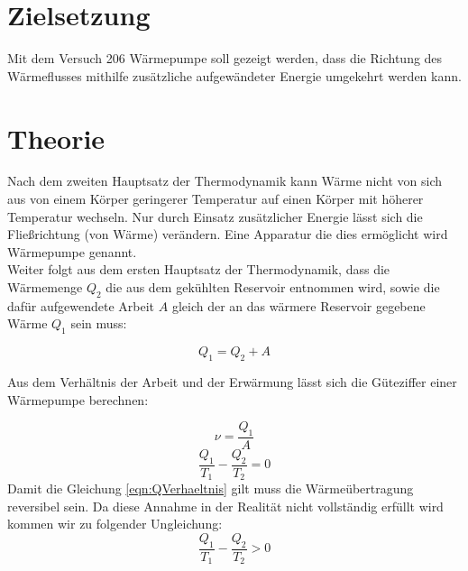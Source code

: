 \section{Zielsetzung}
\label{sec:Zielsetzung}

Mit dem Versuch 206 Wärmepumpe soll gezeigt werden, dass die Richtung des Wärmeflusses mithilfe zusätzliche aufgewändeter
Energie umgekehrt werden kann.


\section{Theorie}
\label{sec:Theorie}
Nach dem zweiten Hauptsatz der Thermodynamik kann Wärme nicht von sich aus von einem Körper geringerer Temperatur auf einen Körper 
mit höherer Temperatur wechseln. Nur durch Einsatz zusätzlicher Energie lässt sich die Fließrichtung (von Wärme) verändern.
Eine Apparatur die dies ermöglicht wird Wärmepumpe genannt.\\
Weiter folgt aus dem ersten Hauptsatz der Thermodynamik, dass die Wärmemenge $Q_2$ die aus dem gekühlten Reservoir entnommen wird,
sowie die dafür aufgewendete Arbeit $A$ gleich der an das wärmere Reservoir gegebene Wärme $Q_1$ sein muss:

\begin{equation}\label{eqn:hauptsatz1}
    Q_1 = Q_2 + A
\end{equation}

Aus dem Verhältnis der Arbeit und der Erwärmung lässt sich die Güteziffer einer Wärmepumpe berechnen:

\begin{equation}\label{eqn:gueteziffer}
    ν = \frac{Q_1}{A}
\end{equation}
\begin{equation}\label{eqn:QVerhaeltnis}
    \frac{Q_1}{T_1} - \frac{Q_2}{T_2} = 0
\end{equation}
Damit die Gleichung \eqref{eqn:QVerhaeltnis} gilt muss die Wärmeübertragung reversibel sein. 
Da diese Annahme in der Realität nicht vollständig erfüllt wird kommen wir zu folgender Ungleichung:
\begin{equation}
    \frac{Q_1}{T_1} - \frac{Q_2}{T_2} > 0
\end{equation}
 
